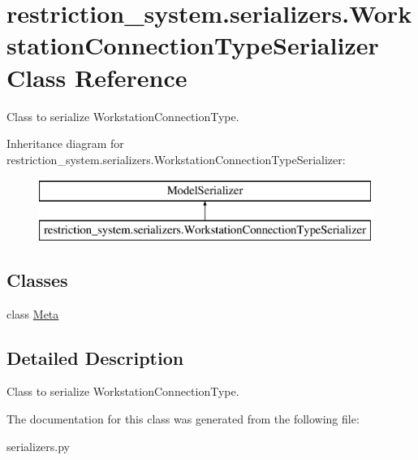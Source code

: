 \hypertarget{classrestriction__system_1_1serializers_1_1WorkstationConnectionTypeSerializer}{}\section{restriction\+\_\+system.\+serializers.\+Workstation\+Connection\+Type\+Serializer Class Reference}
\label{classrestriction__system_1_1serializers_1_1WorkstationConnectionTypeSerializer}


Class to serialize Workstation\+Connection\+Type.  


Inheritance diagram for restriction\+\_\+system.\+serializers.\+Workstation\+Connection\+Type\+Serializer\+:\begin{figure}[H]
\begin{center}
\leavevmode
\includegraphics[height=2.000000cm]{classrestriction__system_1_1serializers_1_1WorkstationConnectionTypeSerializer}
\end{center}
\end{figure}
\subsection*{Classes}
\begin{DoxyCompactItemize}
\item 
class \hyperlink{classrestriction__system_1_1serializers_1_1WorkstationConnectionTypeSerializer_1_1Meta}{Meta}
\end{DoxyCompactItemize}


\subsection{Detailed Description}
Class to serialize Workstation\+Connection\+Type. 

The documentation for this class was generated from the following file\+:\begin{DoxyCompactItemize}
\item 
serializers.\+py\end{DoxyCompactItemize}
